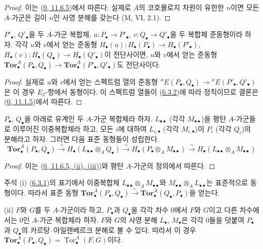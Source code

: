 \begin{proof}
이는 (\hyperref[0.11.6.5-fr]{0, 11.6.5})에서 따른다. 실제로 $A$의
코호몰로지 차원이 유한한 $n$이면 모든 $A$-가군은 길이 $n$인 사영
분해를 갖는다 (M, VI, 2.1).
\end{proof}

\begin{corollary}[6.3.3]
\label{III.6.3.3-fr}
$P'_\bullet$, $Q'_\bullet$을 두 $A$-가군 복합체,
$u:P_\bullet\to P'_\bullet$, $v:Q_\bullet\to Q'_\bullet$을 두
복합체 준동형이라 하자. 각각 $u$와 $v$에서 얻는 준동형
$H_\bullet(u):H_\bullet(P_\bullet)\to H_\bullet(P'_\bullet)$,
$H_\bullet(v):H_\bullet(Q_\bullet)\to H_\bullet(Q'_\bullet)$이
전단사이면, $u$와 $v$에서 얻는 준동형
$\mathbf{Tor}_\bullet^A(P_\bullet,Q_\bullet)\to
\mathbf{Tor}_\bullet^A(P'_\bullet,Q'_\bullet)$도 전단사이다.
\end{corollary}

\begin{proof}
실제로 $u$와 $v$에서 얻는 스펙트럼 열의 준동형
$''E(P_\bullet,Q_\bullet)\to''E(P'_\bullet,Q'_\bullet)$은 이 경우
$E_2$-항에서 동형이다. 이 스펙트럼 열들이
(\hyperref[III.6.3.2-fr]{6.3.2})에 따라 정칙이므로 결론은
(\hyperref[0.11.1.5-fr]{0, 11.1.5})에서 따른다.
\end{proof}

\begin{proposition}[6.3.4]
\label{III.6.3.4-fr}
$P_\bullet$, $Q_\bullet$을 아래로 유계인 두 $A$-가군 복합체라 하자.
$L_{\bullet\bullet}$ (각각 $M_{\bullet\bullet}$)을 평탄 $A$-가군들로
이루어진 이중복합체라 하고, 모든 $i$에 대하여
$L_{i,\bullet}$ (각각 $M_{i,\bullet}$)이 $P_i$ (각각 $Q_i$)의
분해라고 하자. 그러면 다음 표준 동형들이 성립한다.
\[
  \mathbf{Tor}_\bullet^A(P_\bullet,Q_\bullet)
  \xrightarrow{\sim}H_\bullet(L_{\bullet\bullet}\otimes_AQ_\bullet)
  \xrightarrow{\sim}H_\bullet(P_\bullet\otimes_AM_{\bullet\bullet})
  \xrightarrow{\sim}H_\bullet(L_{\bullet\bullet}\otimes_AM_{\bullet\bullet})
  \tag{6.3.4.1}\label{III.6.3.4.1.fr}
\]
\end{proposition}

\begin{proof}
이는 (\hyperref[0.11.6.5-fr]{0, 11.6.5, (ii), (iii)})와 평탄
$A$-가군의 정의에서 따른다.
\end{proof}

\begin{namedtheorem}[6.3.5]{주석}
\label{III.6.3.5-fr}
(i) (\hyperref[III.6.3.1-fr]{6.3.1})의 표기에서 이중복합체
$L_{\bullet\bullet}\otimes_A M_{\bullet\bullet}$와
$M_{\bullet\bullet}\otimes_A L_{\bullet\bullet}$는 표준적으로
동형이다. 따라서 표준 동형
$\mathbf{Tor}_\bullet^A(P_\bullet,Q_\bullet)\xrightarrow{\sim}
\mathbf{Tor}_\bullet^A(Q_\bullet,P_\bullet)$을 얻는다.

(ii) $F$와 $G$를 두 $A$-가군이라 하고, $P_\bullet$과 $Q_\bullet$을
각각 차수 0에서 $F$와 $G$이고 다른 차수에서는 0인 $A$-가군
복합체라 하자. $F$와 $G$의 사영 분해 $L_\bullet$, $M_\bullet$은
각각 0들을 덧붙여 $P_\bullet$과 $Q_\bullet$의
카르탕--아일렌베르크 분해로 볼 수 있다. 따라서 이 경우
$\mathbf{Tor}_\bullet^A(P_\bullet,Q_\bullet)
=\operatorname{Tor}_\bullet^A(F,G)$이다.
\end{namedtheorem}

